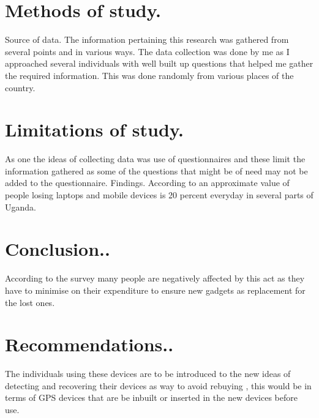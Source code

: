 \documentclass[10pt,letterpaper]{article}
\begin{document}
\section{Methods of study.}
Source of data. The information pertaining this research was gathered from several points and in various ways. The data collection was done by me as I approached several individuals with well built up questions that helped me gather the required information. This was done randomly from various places of the country.
\section{Limitations of study.}

As one the ideas of collecting data was use of questionnaires and these limit the information gathered as some of the questions that might be of need may not be added to the questionnaire.
Findings.
According to an approximate value of people losing laptops and mobile devices is 20 percent everyday in several parts of Uganda.
\section{Conclusion..}
According to the survey many people are negatively affected by this act as they have to minimise on their expenditure to ensure new gadgets as replacement for the lost ones.
\section{Recommendations..}
The individuals using these devices are to be introduced to the new ideas of detecting and recovering their devices as way to avoid rebuying , this would be in terms of GPS devices that are be inbuilt or inserted in the new devices before use.
\end{document}
